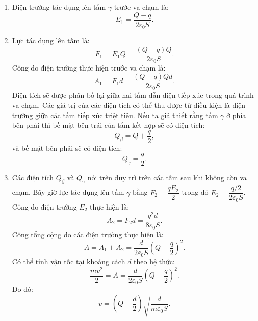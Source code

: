 \begin{vd}
\begin{enumerate}[1)]
\begin{center}
\end{center}
\end{enumerate}
\end{vd}
\begin{loigiai}
\begin{enumerate}[1)]
    \item Điện trường tác dụng lên tấm $\gamma$ trước va chạm là:
    \[E_{1}=\dfrac{Q-q}{2 \varepsilon_{0} S}. \tag{1}\]
    \item Lực tác dụng lên tấm là:
    \[F_{1}=E_{1}Q=\dfrac{(Q-q) Q}{2 \varepsilon_{0} S}. \tag{2}\]
    Công do điện trường thực hiện trước va chạm là:
    \[A_{1}=F_{1}d=\dfrac{(Q-q) Q d}{2 \varepsilon_{0} S}. \tag{3}\]
    Điện tích sẽ được phân bố lại giữa hai tấm dẫn điện tiếp xúc trong quá trình va chạm. Các giá trị của các điện tích có thể thu được từ điều kiện là điện trường giữa các tấm tiếp xúc triệt tiêu. Nếu ta giả thiết rằng tấm $\gamma$ ở phía bên phải thì bề mặt bên trái của tấm kết hợp sẽ có điện tích:
    \[Q_{\beta}=Q + \dfrac{q}{2}, \tag{4}\]
    và bề mặt bên phải sẽ có điện tích: 
    \[Q_{\gamma}= \dfrac{q}{2}. \tag{5}\]
    \item Các điện tích $Q_{\beta}$ và $Q_{\gamma}$ nói trên duy trì trên các tấm sau khi không còn va chạm. Bây giờ lực tác dụng lên tấm $\gamma$ bằng $F_{2}=\dfrac{q E_{2}}{2}$ trong đó $E_2 = \dfrac{q/2}{2 \varepsilon_{0} S}$.\\ 
    Công do điện trường $E_2$ thực hiện là:
    \[A_2=F_{2} d = \dfrac{q^2 d}{8 \varepsilon_{0} S}. \tag{6}\]
    Công tổng cộng do các điện trường thực hiện là:
    \[A=A_{1}+A_{2}=\dfrac{d}{2 \varepsilon_{0} S}\left(Q-\dfrac{q}{2}\right)^{2}. \tag{7}\]
    Có thể tính vận tốc tại khoảng cách $d$ theo hệ thức:
    \[\dfrac{m v^2}{2}=A=\dfrac{d}{2 \varepsilon_{0} S} \left(Q-\dfrac{q}{2}\right)^{2}. \tag{8} \]
    Do đó:
    \[ v=\left(Q-\dfrac{d}{2}\right) \sqrt{\dfrac{d}{m \varepsilon_{0} S}}. \tag{9} \]
\end{enumerate}

\end{loigiai}


